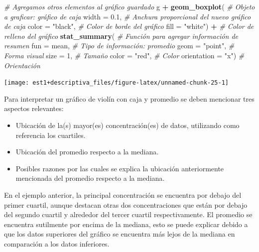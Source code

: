 \documentclass[
  11pt,
]{book}
\newenvironment{Shaded}{\begin{snugshade}}{\end{snugshade}}
\newcommand{\AttributeTok}[1]{\textcolor[rgb]{0.13,0.29,0.53}{#1}}
\newcommand{\CommentTok}[1]{\textcolor[rgb]{0.56,0.35,0.01}{\textit{#1}}}
\newcommand{\DecValTok}[1]{\textcolor[rgb]{0.00,0.00,0.81}{#1}}
\newcommand{\FloatTok}[1]{\textcolor[rgb]{0.00,0.00,0.81}{#1}}
\newcommand{\FunctionTok}[1]{\textcolor[rgb]{0.13,0.29,0.53}{\textbf{#1}}}
\newcommand{\NormalTok}[1]{#1}
\newcommand{\SpecialCharTok}[1]{\textcolor[rgb]{0.81,0.36,0.00}{\textbf{#1}}}
\newcommand{\StringTok}[1]{\textcolor[rgb]{0.31,0.60,0.02}{#1}}
\providecommand{\tightlist}{%
  \setlength{\itemsep}{0pt}\setlength{\parskip}{0pt}}
\theoremstyle{definition}
\theoremstyle{definition}
\theoremstyle{definition}
\theoremstyle{definition}
\theoremstyle{remark}
\begin{document}
\begin{Shaded}
\begin{Highlighting}[]
\CommentTok{\# Agregamos otros elementos al gráfico guardado}
\NormalTok{g }\SpecialCharTok{+} \FunctionTok{geom\_boxplot}\NormalTok{( }\CommentTok{\# Objeto a graficar: gráfico de caja}
  \AttributeTok{width =} \FloatTok{0.1}\NormalTok{, }\CommentTok{\# Anchura proporcional del nuevo gráfico de caja}
  \AttributeTok{color =} \StringTok{"black"}\NormalTok{, }\CommentTok{\# Color de borde del gráfico}
  \AttributeTok{fill =} \StringTok{"white"}\NormalTok{) }\SpecialCharTok{+} \CommentTok{\# Color de relleno del gráfico}
  \FunctionTok{stat\_summary}\NormalTok{( }\CommentTok{\# Función para agregar información de resumen}
    \AttributeTok{fun =}\NormalTok{ mean, }\CommentTok{\# Tipo de información: promedio}
    \AttributeTok{geom =} \StringTok{"point"}\NormalTok{, }\CommentTok{\# Forma visual}
    \AttributeTok{size =} \DecValTok{1}\NormalTok{, }\CommentTok{\# Tamaño}
    \AttributeTok{color =} \StringTok{"red"}\NormalTok{, }\CommentTok{\# Color}
    \AttributeTok{orientation =} \StringTok{"x"}\NormalTok{) }\CommentTok{\# Orientación}
\end{Highlighting}
\end{Shaded}

\begin{center}\texttt{[image: est1+descriptiva\_files/figure-latex/unnamed-chunk-25-1]} \end{center}

Para interpretar un gráfico de violín con caja y promedio se deben mencionar tres aspectos relevantes:

\begin{itemize}
\tightlist
\item
  Ubicación de la(s) mayor(es) concentración(es) de datos, utilizando como referencia los cuartiles.
\item
  Ubicación del promedio respecto a la mediana.
\item
  Posibles razones por las cuales se explica la ubicación anteriormente mencionada del promedio respecto a la mediana.
\end{itemize}

En el ejemplo anterior, la principal concentración se encuentra por debajo del primer cuartil, aunque destacan otras dos concentraciones que están por debajo del segundo cuartil y alrededor del tercer cuartil respectivamente. El promedio se encuentra sutilmente por encima de la mediana, esto se puede explicar debido a que los datos superiores del gráfico se encuentra más lejos de la mediana en comparación a los datos inferiores.
\end{document}
